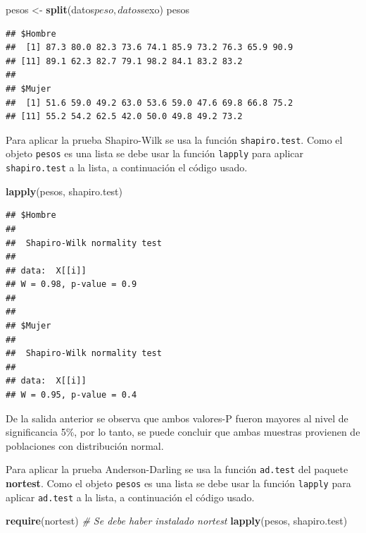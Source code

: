 \documentclass[10pt,]{krantz}
\makeatletter
\newenvironment{Shaded}{\begin{snugshade}}{\end{snugshade}}
\newcommand{\KeywordTok}[1]{\textcolor[rgb]{0.13,0.29,0.53}{\textbf{{#1}}}}
\newcommand{\StringTok}[1]{\textcolor[rgb]{0.31,0.60,0.02}{{#1}}}
\newcommand{\CommentTok}[1]{\textcolor[rgb]{0.56,0.35,0.01}{\textit{{#1}}}}
\newcommand{\NormalTok}[1]{{#1}}
\newenvironment{kframe}{%
\medskip{}
\setlength{\fboxsep}{.8em}
 \def\at@end@of@kframe{}%
 \ifinner\ifhmode%
  \def\at@end@of@kframe{\end{minipage}}%
  \begin{minipage}{\columnwidth}%
 \fi\fi%
 \def\FrameCommand##1{\hskip\@totalleftmargin \hskip-\fboxsep
 \colorbox{shadecolor}{##1}\hskip-\fboxsep
     \hskip-\linewidth \hskip-\@totalleftmargin \hskip\columnwidth}%
 \MakeFramed {\advance\hsize-\width
   \@totalleftmargin\z@ \linewidth\hsize
   \@setminipage}}%
 {\par\unskip\endMakeFramed%
 \at@end@of@kframe}
\renewenvironment{Shaded}{\begin{kframe}}{\end{kframe}}
\makeatother
\begin{document}
\begin{Shaded}
\begin{Highlighting}[]
\NormalTok{pesos <-}\StringTok{ }\KeywordTok{split}\NormalTok{(datos$peso, datos$sexo)}
\NormalTok{pesos}
\end{Highlighting}
\end{Shaded}

\begin{verbatim}
## $Hombre
##  [1] 87.3 80.0 82.3 73.6 74.1 85.9 73.2 76.3 65.9 90.9
## [11] 89.1 62.3 82.7 79.1 98.2 84.1 83.2 83.2
## 
## $Mujer
##  [1] 51.6 59.0 49.2 63.0 53.6 59.0 47.6 69.8 66.8 75.2
## [11] 55.2 54.2 62.5 42.0 50.0 49.8 49.2 73.2
\end{verbatim}

Para aplicar la prueba Shapiro-Wilk se usa la función
\texttt{shapiro.test}. Como el objeto \texttt{pesos} es una lista se
debe usar la función \texttt{lapply} para aplicar \texttt{shapiro.test}
a la lista, a continuación el código usado.

\begin{Shaded}
\begin{Highlighting}[]
\KeywordTok{lapply}\NormalTok{(pesos, shapiro.test)}
\end{Highlighting}
\end{Shaded}

\begin{verbatim}
## $Hombre
## 
##  Shapiro-Wilk normality test
## 
## data:  X[[i]]
## W = 0.98, p-value = 0.9
## 
## 
## $Mujer
## 
##  Shapiro-Wilk normality test
## 
## data:  X[[i]]
## W = 0.95, p-value = 0.4
\end{verbatim}

De la salida anterior se observa que ambos valores-P fueron mayores al
nivel de significancia 5\%, por lo tanto, se puede concluir que ambas
muestras provienen de poblaciones con distribución normal.

Para aplicar la prueba Anderson-Darling se usa la función
\texttt{ad.test} del paquete \textbf{nortest}. Como el objeto
\texttt{pesos} es una lista se debe usar la función \texttt{lapply} para
aplicar \texttt{ad.test} a la lista, a continuación el código usado.

\begin{Shaded}
\begin{Highlighting}[]
\KeywordTok{require}\NormalTok{(nortest) }\CommentTok{# Se debe haber instalado nortest}
\KeywordTok{lapply}\NormalTok{(pesos, shapiro.test)}
\end{Highlighting}
\end{Shaded}
\end{document}
